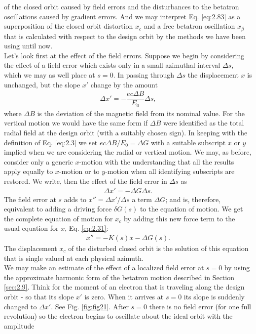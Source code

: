 \documentclass[../sands-adaptation.tex]{subfiles}
\begin{document}
 of the closed orbit caused by field errors and the disturbances to the betatron oscillations
 caused by gradient errors. And we may interpret Eq. \eqref{eq:2.83} as a superposition of the closed orbit distortion $x_c$ and a free betatron oscillation $x_\beta$ that is calculated with respect to the design orbit by the methods we have been using until now.\\
Let’s look first at the effect of the field errors. Suppose we begin by considering the effect of a field error which exists only in a small azimuthal interval $\Delta s$, which we may as well place at $s = 0$. In passing through $\Delta s$ the displacement $x$ is unchanged, but the slope $x'$ change by the amount
\begin{align*}
	\Delta x' = - \dfrac{ec\Delta B}{E_0}\Delta s,
\end{align*}
where $\Delta B$ is the deviation of the magnetic field from its nominal value. For the vertical
 motion we would have the same form if $\Delta B$ were identified as the total radial field at the design orbit (with a suitably chosen sign). In keeping with the definition of Eq. \eqref{eq:2.3} we set $ec \Delta B/E_0 = \Delta G$ with a suitable subscript $x$ or $y$ implied when we are considering the radial or vertical motion. We may, as before, consider only a generic $x$-motion with the understanding that all the results apply equally to $x$-motion
 or to $y$-motion when all identifying subscripts are restored. We write, then the effect of the field error in $\Delta s$ as
\begin{align}\label{eq:2.84}
	\Delta x' = -\Delta G \Delta s.
\end{align}
The field error at $s$ adds to $x'' = \Delta x'/\Delta s$ a term $\Delta G$; and is, therefore, equivalent to adding a driving force $\delta G(s)$ to the equation of motion. We get the complete
equation of motion for $x_c$ by adding this new force term to the usual equation for $x$, Eq. \eqref{eq:2.31}:
\begin{align}\label{eq:2.85}
	x'' = -K(s)x -\Delta G(s).
\end{align}
The displacement $x_c$ of the disturbed closed orbit is the solution of this equation
that is single valued at each physical azimuth.\\
We may make an estimate of the effect of a localized field error at $s = 0$ by using the approximate harmonic form of the betatron motion described in Section \ref{sec:2.9}. Think for the moment of an electron that is traveling along the design orbit - so that its slope $x'$ is zero. When it arrives at $s = 0$ its slope is suddenly changed to $\Delta x'$. See Fig. \ref{fig:fig21}. After $s = 0$ there is no field error (for one full revolution) so the electron begins to oscillate about the ideal orbit with the amplitude
\end{document}
